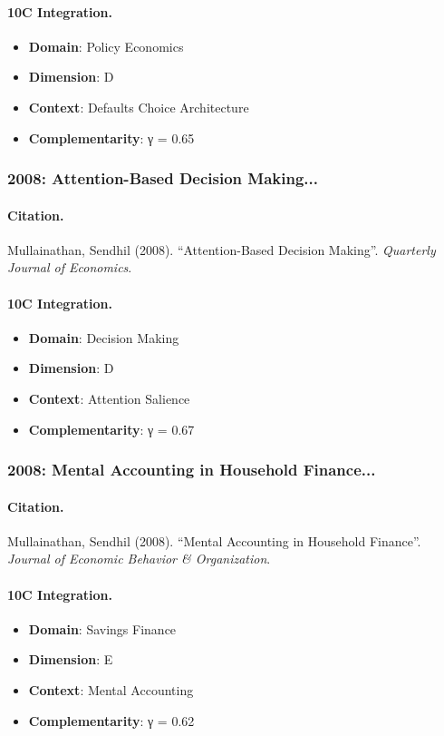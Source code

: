 \paragraph{10C Integration.}
\begin{itemize}[nosep]
  \item \textbf{Domain}: Policy Economics
  \item \textbf{Dimension}: D
  \item \textbf{Context}: Defaults Choice Architecture
  \item \textbf{Complementarity}: γ = 0.65
\end{itemize}


\subsubsection{2008: Attention-Based Decision Making...}

\paragraph{Citation.}
Mullainathan, Sendhil (2008). ``Attention-Based Decision Making''. \textit{Quarterly Journal of Economics}.

\paragraph{10C Integration.}
\begin{itemize}[nosep]
  \item \textbf{Domain}: Decision Making
  \item \textbf{Dimension}: D
  \item \textbf{Context}: Attention Salience
  \item \textbf{Complementarity}: γ = 0.67
\end{itemize}


\subsubsection{2008: Mental Accounting in Household Finance...}

\paragraph{Citation.}
Mullainathan, Sendhil (2008). ``Mental Accounting in Household Finance''. \textit{Journal of Economic Behavior & Organization}.

\paragraph{10C Integration.}
\begin{itemize}[nosep]
  \item \textbf{Domain}: Savings Finance
  \item \textbf{Dimension}: E
  \item \textbf{Context}: Mental Accounting
  \item \textbf{Complementarity}: γ = 0.62
\end{itemize}


